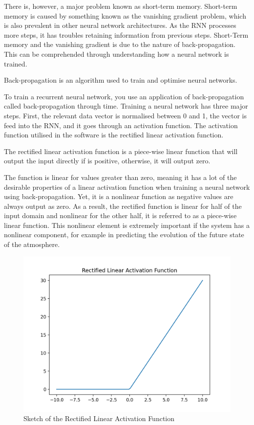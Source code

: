There is, however, a major problem known as short-term memory. Short-term memory is caused by something known as the vanishing gradient problem, which is also prevalent in other neural network architectures. As the RNN processes more steps, it has troubles retaining information from previous steps. Short-Term memory and the vanishing gradient is due to the nature of back-propagation. This can be comprehended through understanding how a neural network is trained\cite{intro_rnn}.

\begin{definition}
Back-propagation is an algorithm used to train and optimise neural networks.
\end{definition}

To train a recurrent neural network, you use an application of back-propagation called back-propagation through time. Training a neural network has three major steps. First, the relevant data vector is normalised between 0 and 1, the vector is feed into the RNN, and it goes through an activation function. The activation function utilised in the software is the rectified linear activation function\cite{lstm_rnn}. 

\begin{definition}
The rectified linear activation function is a piece-wise linear function that will output the input directly if is positive, otherwise, it will output zero.
\end{definition}

The function is linear for values greater than zero, meaning it has a lot of the desirable properties of a linear activation function when training a neural network using back-propagation. Yet, it is a nonlinear function as negative values are always output as zero. As a result, the rectified function is linear for half of the input domain and nonlinear for the other half, it is referred to as a piece-wise linear function\cite{relu}. This nonlinear element is extremely important if the system has a nonlinear component, for example in predicting the evolution of the future state of the atmosphere.

\begin{figure}[H]
    \centering
    \includegraphics[width=.65\linewidth]{Images/relu.png}
    \caption{Sketch of the Rectified Linear Activation Function}
\end{figure}

